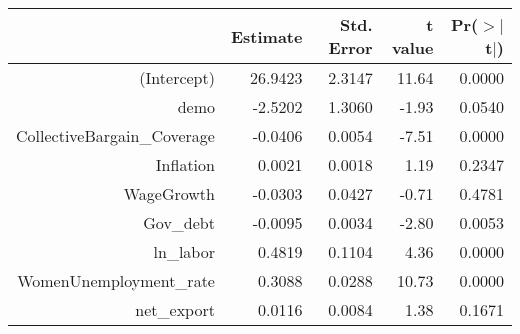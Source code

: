 \begin{table}[ht]
\centering
\begin{tabular}{rrrrr}
  \hline
 & Estimate & Std. Error & t value & Pr($>$$|$t$|$) \\ 
  \hline
(Intercept) & 26.9423 & 2.3147 & 11.64 & 0.0000 \\ 
  demo & -2.5202 & 1.3060 & -1.93 & 0.0540 \\ 
  CollectiveBargain\_Coverage & -0.0406 & 0.0054 & -7.51 & 0.0000 \\ 
  Inflation & 0.0021 & 0.0018 & 1.19 & 0.2347 \\ 
  WageGrowth & -0.0303 & 0.0427 & -0.71 & 0.4781 \\ 
  Gov\_debt & -0.0095 & 0.0034 & -2.80 & 0.0053 \\ 
  ln\_labor & 0.4819 & 0.1104 & 4.36 & 0.0000 \\ 
  WomenUnemployment\_rate & 0.3088 & 0.0288 & 10.73 & 0.0000 \\ 
  net\_export & 0.0116 & 0.0084 & 1.38 & 0.1671 \\ 
   \hline
\end{tabular}
\end{table}
